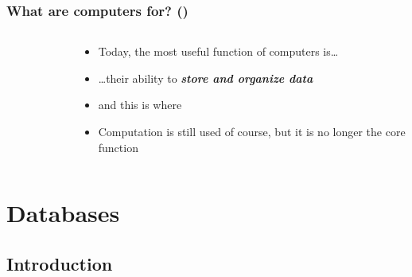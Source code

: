 \documentclass[\printmode,compress,xcolor=dvipsnames]{beamer}
\begin{document}
\begin{frame}
  \frametitle<+->{What are computers for? ()}
  \begin{columns}[T]
    \begin{column}{\leftcolumn}
      \begin{figure}[H!]
      \end{figure}
    \end{column}
    \begin{column}{\rightcolumn}
      \begin{itemize}[<+- | alert@+->]

          \item Today, the most useful function of computers is\dots

          \item \dots their ability to \emph{\bfseries store and organize data}

          \item and this is where 

          \item Computation is still used of course, but it is no longer the
                core function 

      \end{itemize}
    \end{column}
  \end{columns}
\end{frame}

\section{Databases}

\subsection{Introduction}

\end{document}
